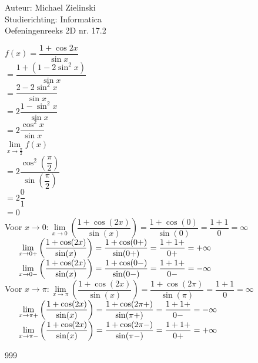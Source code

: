 \documentclass[a4paper]{article}
\begin{document}
\noindent \large Auteur: Michael Zielinski\\
\noindent \large Studierichting: Informatica\\
\noindent \large Oefeningenreeks 2D nr. 17.2\\

\medskip
\normalsize

$ f(x) = \dfrac{1 + \cos 2x}{\sin x} $\\

$ = \dfrac{1 + \left(1 - 2\sin^2 x\right)}{\sin x} $\\

$ = \dfrac{2 - 2\sin^2 x}{\sin x} $\\

$ = 2\dfrac{1 - \sin^2 x}{\sin x} $\\

$ = 2\dfrac{\cos^2 x}{\sin x} $\\

$ \lim\limits_{x \to \tfrac{\pi}{2}} f(x) $\\

$ = 2\dfrac{\cos^2\left(\dfrac{\pi}{2}\right)}{\sin\left(\dfrac{\pi}{2}\right)} $\\

$ = 2\dfrac{0}{1} $\\

$ = 0 $\\

Voor $x \to 0: \lim\limits_{x \to 0}\left(\dfrac{1 + \cos(2x)}{\sin(x)}\right) = \dfrac{1 + \cos(0)}{\sin(0)} = \dfrac{1 + 1}{0} = \infty$\\

$\indent \lim\limits_{x \to 0+}\left(\dfrac{1 + \cos(2x)}{\sin(x)}\right) = \dfrac{1 + \cos(0+)}{\sin(0+)} = \dfrac{1 + 1+}{0+} = +\infty$\\

$\indent \lim\limits_{x \to 0-}\left(\dfrac{1 + \cos(2x)}{\sin(x)}\right) = \dfrac{1 + \cos(0-)}{\sin(0-)} = \dfrac{1 + 1+}{0-} = -\infty$\\

Voor $x \to \pi: \lim\limits_{x \to \pi}\left(\dfrac{1 + \cos(2x)}{\sin(x)}\right) = \dfrac{1 + \cos(2\pi)}{\sin(\pi)} = \dfrac{1 + 1}{0} = \infty$\\

$\indent \lim\limits_{x \to \pi+}\left(\dfrac{1 + \cos(2x)}{\sin(x)}\right) = \dfrac{1 + \cos(2\pi+)}{\sin(\pi+)} = \dfrac{1 + 1+}{0-} = -\infty$\\

$\indent \lim\limits_{x \to \pi-}\left(\dfrac{1 + \cos(2x)}{\sin(x)}\right) = \dfrac{1 + \cos(2\pi-)}{\sin(\pi-)} = \dfrac{1 + 1+}{0+} = +\infty$\\

\begin{thebibliography}{999}
\end{thebibliography}
\end{document}
